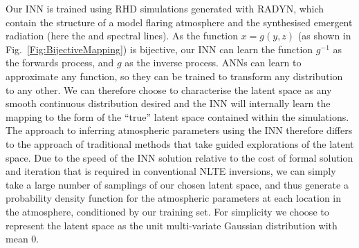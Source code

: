 Our INN is trained using RHD simulations generated with RADYN, which contain the structure of a model flaring atmosphere and the synthesised emergent radiation (here the \Ha{} and \CaLine{} spectral lines).
As the function $x = g(y, z)$ (as shown in Fig.~\ref{Fig:BijectiveMapping}) is bijective, our INN can learn the function $g^{-1}$ as the forwards process, and $g$ as the inverse process.
ANNs can learn to approximate any function, so they can be trained to transform any distribution to any other.
We can therefore choose to characterise the latent space as any smooth continuous distribution desired and the INN will internally learn the mapping to the form of the ``true'' latent space contained within the simulations.
The approach to inferring atmospheric parameters using the INN therefore differs to the approach of traditional methods that take guided explorations of the latent space.
Due to the speed of the INN solution relative to the cost of formal solution and iteration that is required in conventional NLTE inversions, we can simply take a large number of samplings of our chosen latent space, and thus generate a probability density function for the atmospheric parameters at each location in the atmosphere, conditioned by our training set.
For simplicity we choose to represent the latent space as the unit multi-variate Gaussian distribution with mean 0.


